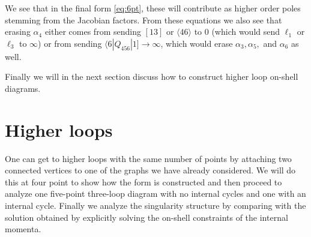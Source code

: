 \documentclass[letter,11pt]{article}
\newcommand{\ab}[1]{\langle #1 \rangle}
\newcommand{\sqb}[1]{[ #1 ]}
\newcommand{\aMs}[3]{\langle #1|#2|#3]}  		%
\begin{document}
We see that in the final form \eqref{eq:6pt}, these will contribute as higher order poles stemming from the Jacobian factors.  From these equations we also see that erasing $\alpha_4$ either comes from sending $\sqb{13}$ or $\ab{46}$ to 0 (which would send $\ell_1$ or $\ell_3$ to $\infty$) or from sending $\aMs{6}{Q_{456}}{1}\to \infty$, which would erase $\alpha_3,\alpha_5,$ and $\alpha_6$ as well.

Finally we will in the next section discuss how to construct higher loop on-shell diagrams. 
\newpage
\section{Higher loops\label{sec:higherloops}}
One can get to higher loops with the same number of points by attaching two connected vertices to one of the graphs we have already considered. We will do this at four point to show how the form is constructed and then proceed to analyze one five-point three-loop diagram with no internal cycles and one with an internal cycle. Finally we analyze the singularity structure by comparing with the solution obtained by explicitly solving the on-shell constraints of the internal momenta.
\end{document}
